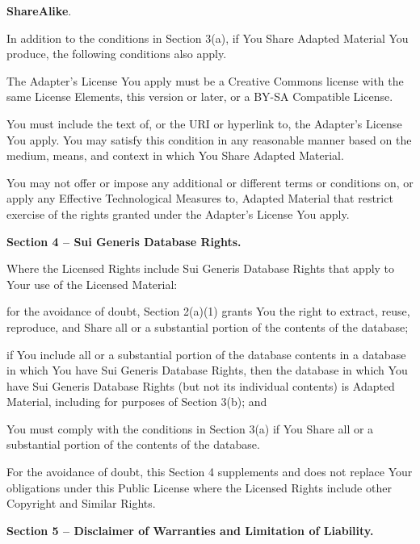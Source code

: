 \begin{doclicense@enumerate}
\item \textbf{ShareAlike}.
\par In addition to the conditions in Section 3(a), if You Share Adapted Material You produce, the following conditions also apply.
\begin{doclicense@enumerate}
\item The Adapter’s License You apply must be a Creative Commons license with the same License Elements, this version or later, or a BY-SA Compatible License.
\item You must include the text of, or the URI or hyperlink to, the Adapter's License You apply. You may satisfy this condition in any reasonable manner based on the medium, means, and context in which You Share Adapted Material.
\item You may not offer or impose any additional or different terms or conditions on, or apply any Effective Technological Measures to, Adapted Material that restrict exercise of the rights granted under the Adapter's License You apply.
\end{doclicense@enumerate}

\end{doclicense@enumerate}
\par \textbf{Section 4 – Sui Generis Database Rights.}
\par Where the Licensed Rights include Sui Generis Database Rights that apply to Your use of the Licensed Material:
\begin{doclicense@enumerate}
\item for the avoidance of doubt, Section 2(a)(1) grants You the right to extract, reuse, reproduce, and Share all or a substantial portion of the contents of the database;
\item if You include all or a substantial portion of the database contents in a database in which You have Sui Generis Database Rights, then the database in which You have Sui Generis Database Rights (but not its individual contents) is Adapted Material, including for purposes of Section 3(b); and
\item You must comply with the conditions in Section 3(a) if You Share all or a substantial portion of the contents of the database.
\end{doclicense@enumerate}
For the avoidance of doubt, this Section 4 supplements and does not replace Your obligations under this Public License where the Licensed Rights include other Copyright and Similar Rights.
\par \textbf{Section 5 – Disclaimer of Warranties and Limitation of Liability.}
